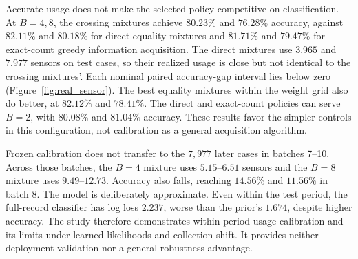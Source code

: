 \documentclass[manuscript, screen, review]{jair}
\begin{document}
Accurate usage does not make the selected policy competitive on classification. At $B=4,8$, the crossing mixtures achieve $80.23\%$ and $76.28\%$ accuracy, against $82.11\%$ and $80.18\%$ for direct equality mixtures and $81.71\%$ and $79.47\%$ for exact-count greedy information acquisition. The direct mixtures use $3.965$ and $7.977$ sensors on test cases, so their realized usage is close but not identical to the crossing mixtures'. Each nominal paired accuracy-gap interval lies below zero (Figure~\ref{fig:real_sensor}). The best equality mixtures within the weight grid also do better, at $82.12\%$ and $78.41\%$. The direct and exact-count policies can serve $B=2$, with $80.08\%$ and $81.04\%$ accuracy. These results favor the simpler controls in this configuration, not calibration as a general acquisition algorithm.

Frozen calibration does not transfer to the $7{,}977$ later cases in batches 7--10. Across those batches, the $B=4$ mixture uses $5.15$--$6.51$ sensors and the $B=8$ mixture uses $9.49$--$12.73$. Accuracy also falls, reaching $14.56\%$ and $11.56\%$ in batch 8. The model is deliberately approximate. Even within the test period, the full-record classifier has log loss $2.237$, worse than the prior's $1.674$, despite higher accuracy. The study therefore demonstrates within-period usage calibration and its limits under learned likelihoods and collection shift. It provides neither deployment validation nor a general robustness advantage.
\end{document}
